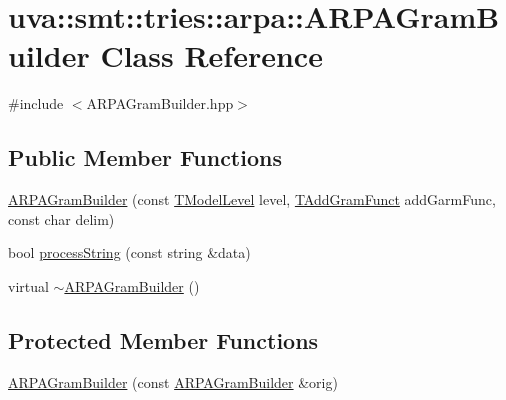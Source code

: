 \hypertarget{classuva_1_1smt_1_1tries_1_1arpa_1_1_a_r_p_a_gram_builder}{}\section{uva\+:\+:smt\+:\+:tries\+:\+:arpa\+:\+:A\+R\+P\+A\+Gram\+Builder Class Reference}
\label{classuva_1_1smt_1_1tries_1_1arpa_1_1_a_r_p_a_gram_builder}


{\ttfamily \#include $<$A\+R\+P\+A\+Gram\+Builder.\+hpp$>$}

\subsection*{Public Member Functions}
\begin{DoxyCompactItemize}
\item 
\hyperlink{classuva_1_1smt_1_1tries_1_1arpa_1_1_a_r_p_a_gram_builder_aabc607c9ba43ff636456b23cb8236e60}{A\+R\+P\+A\+Gram\+Builder} (const \hyperlink{namespaceuva_1_1smt_1_1tries_a26064146e98856c7c4185efab0e61a36}{T\+Model\+Level} level, \hyperlink{namespaceuva_1_1smt_1_1tries_1_1arpa_a16805e23db5ab5a826e46ae4a59a0a71}{T\+Add\+Gram\+Funct} add\+Garm\+Func, const char delim)
\item 
bool \hyperlink{classuva_1_1smt_1_1tries_1_1arpa_1_1_a_r_p_a_gram_builder_af505ce38243a3e39fbc6b4d9ee83368f}{process\+String} (const string \&data)
\item 
virtual \hyperlink{classuva_1_1smt_1_1tries_1_1arpa_1_1_a_r_p_a_gram_builder_ab65614501c700f5654ddd3397050e671}{$\sim$\+A\+R\+P\+A\+Gram\+Builder} ()
\end{DoxyCompactItemize}
\subsection*{Protected Member Functions}
\begin{DoxyCompactItemize}
\item 
\hyperlink{classuva_1_1smt_1_1tries_1_1arpa_1_1_a_r_p_a_gram_builder_ad9de06a743ac014b818df81d2bec0267}{A\+R\+P\+A\+Gram\+Builder} (const \hyperlink{classuva_1_1smt_1_1tries_1_1arpa_1_1_a_r_p_a_gram_builder}{A\+R\+P\+A\+Gram\+Builder} \&orig)
\end{DoxyCompactItemize}
